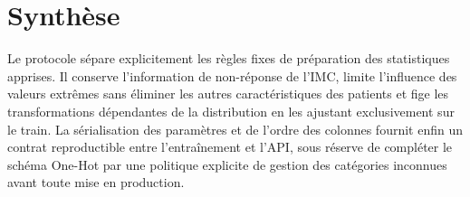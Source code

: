 \section{Synthèse}
Le protocole sépare explicitement les règles fixes de préparation des statistiques apprises. Il conserve l'information de non-réponse de l'IMC, limite l'influence des valeurs extrêmes sans éliminer les autres caractéristiques des patients et fige les transformations dépendantes de la distribution en les ajustant exclusivement sur le train. La sérialisation des paramètres et de l'ordre des colonnes fournit enfin un contrat reproductible entre l'entraînement et l'API, sous réserve de compléter le schéma One-Hot par une politique explicite de gestion des catégories inconnues avant toute mise en production.
